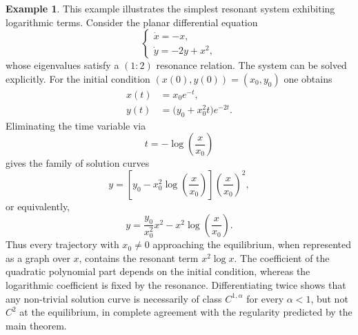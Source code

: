 \documentclass{amsart}
\theoremstyle{plain}
\theoremstyle{definition}
\newtheorem{example}[theorem]{Example}
\begin{document}
\begin{example}
This example illustrates the simplest resonant system exhibiting logarithmic
terms. Consider the planar differential equation
\begin{equation}\label{explres}
\begin{cases}
\dot x=-x,\\
\dot y=-2y+x^2,
\end{cases}
\end{equation}
whose eigenvalues satisfy a $(1:2)$ resonance relation. The system can be solved explicitly. For the initial condition
$(x(0),y(0))=(x_0,y_0)$ one obtains
\begin{equation}\label{sol1}
\begin{split}
x(t)&=x_0e^{-t},\\
y(t)&=\bigl(y_0+x_0^2t\bigr)e^{-2t}.
\end{split}
\end{equation}
Eliminating the time variable via
\begin{equation}
t=-\log\!\left(\frac{x}{x_0}\right)
\end{equation}
gives the family of solution curves
\begin{equation}\label{soly1}
y=
\left[
y_0
-
x_0^2
\log\!\left(\frac{x}{x_0}\right)
\right]
\left(\frac{x}{x_0}\right)^2,
\end{equation}
or equivalently,
\begin{equation}
y
=
\frac{y_0}{x_0^2}x^2
-
x^2\log\!\left(\frac{x}{x_0}\right).
\end{equation}
Thus every trajectory with $x_0\neq0$ approaching the equilibrium, when represented as a graph over $x$, contains the resonant term
$x^2\log x$. The coefficient of the quadratic polynomial part depends on the
initial condition, whereas the logarithmic coefficient is fixed by the resonance. Differentiating twice shows that any non-trivial solution curve is necessarily of class
$C^{1,\alpha}$ for every $\alpha<1$, but not $C^2$ at the
equilibrium, in complete agreement with the regularity predicted by the main theorem.
\end{example}
\end{document}
